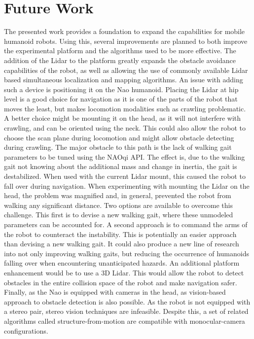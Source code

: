 \section{Future Work}
The presented work provides a foundation to expand the capabilities for
mobile humanoid robots. Using this, several improvements are planned to both
improve the experimental platform and the algorithms used to be more effective.
The addition of the Lidar to the platform greatly expands the obstacle avoidance
capabilities of the robot, as well as allowing the use of commonly available
Lidar based simultaneous localization and mapping algorithms.
An issue with adding such a device is positioning it on the Nao humanoid.
Placing the Lidar at hip level is a good choice for navigation as it is one of
the parts of the robot that moves the least, but makes locomotion modalities
such as crawling problematic. A better choice might be mounting it on the head,
as it will not interfere with crawling, and can be oriented using the neck.
This could also allow the robot to choose the scan plane during locomotion
and might allow obstacle detecting during crawling.
The major obstacle to this path is the lack of walking gait parameters to be 
tuned using the NAOqi API. The effect is, due to the walking gait not knowing
about the additional mass and change in inertia, the gait is destabilized.
When used with the current Lidar mount, this caused the robot to fall over
during navigation. When experimenting with mounting the Lidar on the head,
the problem was magnified and, in general, prevented the robot from walking
any significant distance.
Two options are available to overcome this challenge.
This first is to devise a new walking gait, where these unmodeled parameters
can be accounted for. A second approach is to command the arms of the robot
to counteract the instability. This is potentially an easier approach than
devising a new walking gait. It could also produce a new line of research into
not only improving walking gaits, but reducing the occurrence of humanoids
falling over when encountering unanticipated hazards. 
An additional platform enhancement would be to use a 3D Lidar.
This would allow the robot to detect obstacles in the entire collision space
of the robot and make navigation safer.
Finally, as the Nao is equipped with cameras in the head, as vision-based
approach to obstacle detection is also possible. As the robot is not equipped
with a stereo pair, stereo vision techniques are infeasible. Despite this,
a set of related algorithms called structure-from-motion are compatible with
monocular-camera configurations.

